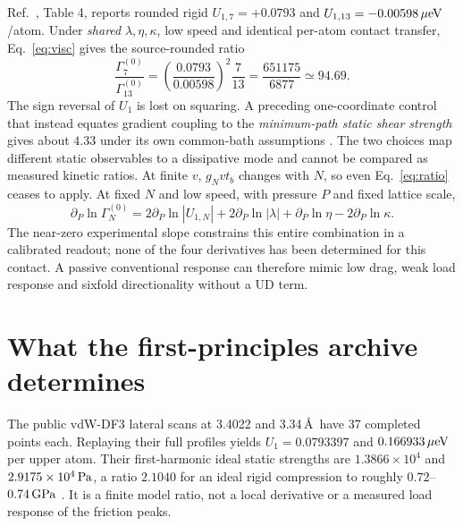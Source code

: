 \documentclass[9pt,a4paper,twocolumn]{extarticle}
\begin{document}
Ref.~\cite{lebedeva}, Table 4, reports rounded rigid $U_{1,7}=+0.0793$ and $U_{1,13}=-0.00598\,\mu{\rm eV}$/atom. Under \emph{shared} $\lambda,\eta,\kappa$, low speed and identical per-atom contact transfer, Eq.~\eqref{eq:visc} gives the source-rounded ratio
\begin{equation}
 \frac{\Gamma_7^{(0)}}{\Gamma_{13}^{(0)}}=
 \left(\frac{0.0793}{0.00598}\right)^2\frac7{13}
 =\frac{651175}{6877}\simeq94.69.\label{eq:ratio}
\end{equation}
The sign reversal of $U_1$ is lost on squaring. A preceding one-coordinate control that instead equates gradient coupling to the \emph{minimum-path static shear strength} gives about $4.33$ under its own common-bath assumptions \cite{udphysics}. The two choices map different static observables to a dissipative mode and cannot be compared as measured kinetic ratios. At finite $v$, $g_Nvt_b$ changes with $N$, so even Eq.~\eqref{eq:ratio} ceases to apply. At fixed $N$ and low speed, with pressure $P$ and fixed lattice scale,
\begin{equation}
 \partial_P\ln\Gamma_N^{(0)}=2\partial_P\ln|U_{1,N}|+
 2\partial_P\ln|\lambda|+\partial_P\ln\eta-2\partial_P\ln\kappa.
 \label{eq:load}
\end{equation}
The near-zero experimental slope constrains this entire combination in a calibrated readout; none of the four derivatives has been determined for this contact. A passive conventional response can therefore mimic low drag, weak load response and sixfold directionality without a UD term.

\section{What the first-principles archive determines}
The public vdW-DF3 lateral scans at 3.4022 and 3.34\,\AA\ have 37 completed points each. Replaying their full profiles yields $U_1=0.0793397$ and $0.166933\,\mu{\rm eV}$ per upper atom. Their first-harmonic ideal static strengths are $1.3866\times10^4$ and $2.9175\times10^4\,{\rm Pa}$, a ratio $2.1040$ for an ideal rigid compression to roughly $0.72$--$0.74\,{\rm GPa}$ \cite{lebedeva,zenodo,udrecord}. It is a finite model ratio, not a local derivative or a measured load response of the friction peaks.
\end{document}
